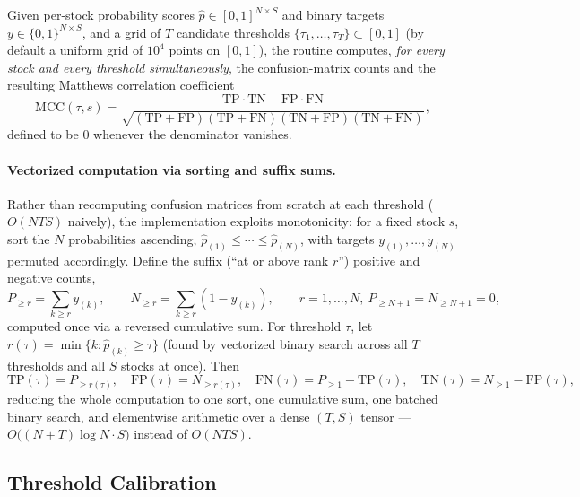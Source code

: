 \documentclass[stu,floatsintext]{apa7}
\begin{document}
Given per-stock probability scores $\hat p\in[0,1]^{N\times S}$ and binary targets $y\in\{0,1\}^{N\times
S}$, and a grid of $T$ candidate thresholds $\{\tau_1,\dots,\tau_T\}\subset[0,1]$ (by default a uniform
grid of $10^4$ points on $[0,1]$), the routine computes, \emph{for every stock and every threshold
simultaneously}, the confusion-matrix counts and the resulting Matthews correlation coefficient
\begin{equation}
  \label{eq:mcc}
  \mathrm{MCC}(\tau,s) = \frac{\mathrm{TP}\cdot\mathrm{TN} - \mathrm{FP}\cdot\mathrm{FN}}
  {\sqrt{(\mathrm{TP}+\mathrm{FP})(\mathrm{TP}+\mathrm{FN})(\mathrm{TN}+\mathrm{FP})(\mathrm{TN}+\mathrm{FN})}},
\end{equation}
defined to be $0$ whenever the denominator vanishes.

\paragraph{Vectorized computation via sorting and suffix sums.} Rather than recomputing confusion
matrices from scratch at each threshold ($O(NT S)$ naively), the implementation exploits monotonicity: for
a fixed stock $s$, sort the $N$ probabilities ascending, $\hat p_{(1)}\le\cdots\le\hat p_{(N)}$, with
targets $y_{(1)},\dots,y_{(N)}$ permuted accordingly. Define the suffix (``at or above rank $r$'') positive
and negative counts,
\begin{equation}
  P_{\ge r} = \sum_{k\ge r} y_{(k)}, \qquad N_{\ge r} = \sum_{k\ge r} (1-y_{(k)}), \qquad r=1,\dots,N,\ P_{\ge N+1}=N_{\ge N+1}=0,
\end{equation}
computed once via a reversed cumulative sum. For threshold $\tau$, let $r(\tau) = \min\{k : \hat p_{(k)}\ge
\tau\}$ (found by vectorized binary search across all $T$ thresholds and all $S$
stocks at once). Then
\begin{equation}
  \mathrm{TP}(\tau) = P_{\ge r(\tau)}, \quad
  \mathrm{FP}(\tau) = N_{\ge r(\tau)}, \quad
  \mathrm{FN}(\tau) = P_{\ge 1} - \mathrm{TP}(\tau), \quad
  \mathrm{TN}(\tau) = N_{\ge 1} - \mathrm{FP}(\tau),
\end{equation}
reducing the whole computation to one sort, one cumulative sum, one batched binary search, and elementwise
arithmetic over a dense $(T,S)$ tensor — $O\bigl((N+T)\log N \cdot S\bigr)$ instead of $O(NTS)$.

\subsection{Threshold Calibration}
\end{document}
